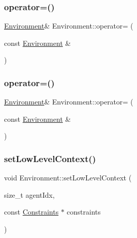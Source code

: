 \subsubsection{\texorpdfstring{operator=()}{operator=()}\hspace{0.1cm}{\footnotesize\ttfamily [1/2]}}
{\footnotesize\ttfamily \hyperlink{class_environment}{Environment}\& Environment\+::operator= (\begin{DoxyParamCaption}\item[{const \hyperlink{class_environment}{Environment} \&}]{ }\end{DoxyParamCaption})\hspace{0.3cm}{\ttfamily [delete]}}

\mbox{\label{class_environment_a31a390fc46a51b9adab61b2511ef2a31}} 
\subsubsection{\texorpdfstring{operator=()}{operator=()}\hspace{0.1cm}{\footnotesize\ttfamily [2/2]}}
{\footnotesize\ttfamily \hyperlink{class_environment}{Environment}\& Environment\+::operator= (\begin{DoxyParamCaption}\item[{const \hyperlink{class_environment}{Environment} \&}]{ }\end{DoxyParamCaption})\hspace{0.3cm}{\ttfamily [delete]}}

\mbox{\label{class_environment_a56b6dff6d3af3fe6404936a14a259c56}} 
\subsubsection{\texorpdfstring{set\+Low\+Level\+Context()}{setLowLevelContext()}\hspace{0.1cm}{\footnotesize\ttfamily [1/2]}}
{\footnotesize\ttfamily void Environment\+::set\+Low\+Level\+Context (\begin{DoxyParamCaption}\item[{size\+\_\+t}]{agent\+Idx,  }\item[{const \hyperlink{struct_constraints}{Constraints} $\ast$}]{constraints }\end{DoxyParamCaption})\hspace{0.3cm}{\ttfamily [inline]}}



